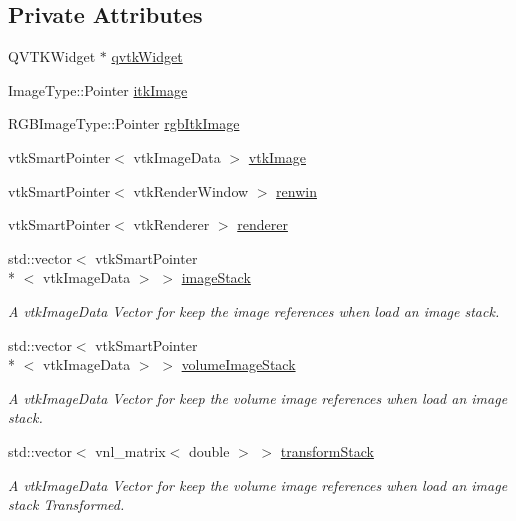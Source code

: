 \subsection*{Private Attributes}
\begin{DoxyCompactItemize}
\item 
Q\-V\-T\-K\-Widget $\ast$ \hyperlink{class_q_v_t_k_image_widget_a461f6ca20211ec9ff4b367aeb95e8139}{qvtk\-Widget}
\item 
Image\-Type\-::\-Pointer \hyperlink{class_q_v_t_k_image_widget_ae5b308466d4f198990b9d132319f9f34}{itk\-Image}
\item 
R\-G\-B\-Image\-Type\-::\-Pointer \hyperlink{class_q_v_t_k_image_widget_ae8cea614979ccdb6fe65551c8269b116}{rgb\-Itk\-Image}
\item 
vtk\-Smart\-Pointer$<$ vtk\-Image\-Data $>$ \hyperlink{class_q_v_t_k_image_widget_aa55aaf6e037ee4d789449ff3d365201b}{vtk\-Image}
\item 
vtk\-Smart\-Pointer$<$ vtk\-Render\-Window $>$ \hyperlink{class_q_v_t_k_image_widget_a1ffdb2716a14bd2cb4dc845c50fc474c}{renwin}
\item 
vtk\-Smart\-Pointer$<$ vtk\-Renderer $>$ \hyperlink{class_q_v_t_k_image_widget_a06c273e6e390e8e860fa4c0c932a2cf8}{renderer}
\item 
std\-::vector$<$ vtk\-Smart\-Pointer\\*
$<$ vtk\-Image\-Data $>$ $>$ \hyperlink{class_q_v_t_k_image_widget_a336708e27578dab885b069f12c120138}{image\-Stack}
\begin{DoxyCompactList}\small\item\em A vtk\-Image\-Data Vector for keep the image references when load an image stack. \end{DoxyCompactList}\item 
std\-::vector$<$ vtk\-Smart\-Pointer\\*
$<$ vtk\-Image\-Data $>$ $>$ \hyperlink{class_q_v_t_k_image_widget_a2b96df48cde8c89ddb4a2a76c0b619c3}{volume\-Image\-Stack}
\begin{DoxyCompactList}\small\item\em A vtk\-Image\-Data Vector for keep the volume image references when load an image stack. \end{DoxyCompactList}\item 
std\-::vector$<$ vnl\-\_\-matrix$<$ double $>$ $>$ \hyperlink{class_q_v_t_k_image_widget_a77de3bb5e2ca81b3c66ca5864003d02d}{transform\-Stack}
\begin{DoxyCompactList}\small\item\em A vtk\-Image\-Data Vector for keep the volume image references when load an image stack Transformed. \end{DoxyCompactList}\item 

\end{DoxyCompactItemize}
